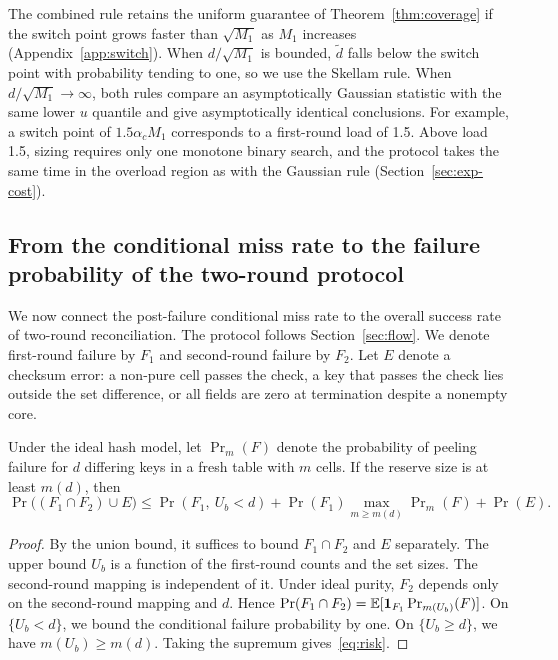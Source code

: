 The combined rule retains the uniform guarantee of Theorem~\ref{thm:coverage} if the switch point grows faster than $\sqrt{M_1}$ as $M_1$ increases (Appendix~\ref{app:switch}). When $d/\sqrt{M_1}$ is bounded, $\widetilde d$ falls below the switch point with probability tending to one, so we use the Skellam rule. When $d/\sqrt{M_1}\to\infty$, both rules compare an asymptotically Gaussian statistic with the same lower $u$ quantile and give asymptotically identical conclusions. For example, a switch point of $1.5\alpha_cM_1$ corresponds to a first-round load of 1.5. Above load 1.5, sizing requires only one monotone binary search, and the protocol takes the same time in the overload region as with the Gaussian rule (Section~\ref{sec:exp-cost}).

\subsection{From the conditional miss rate to the failure probability of the two-round protocol}\label{sec:protocol}
We now connect the post-failure conditional miss rate to the overall success rate of two-round reconciliation. The protocol follows Section~\ref{sec:flow}. We denote first-round failure by $F_1$ and second-round failure by $F_2$. Let $E$ denote a checksum error: a non-pure cell passes the check, a key that passes the check lies outside the set difference, or all fields are zero at termination despite a nonempty core.

\begin{theorem}\label{thm:protocol}
Under the ideal hash model, let $\Pr_m(F)$ denote the probability of peeling failure for $d$ differing keys in a fresh table with $m$ cells. If the reserve size is at least $m(d)$, then
\begin{equation}
\Pr\big((F_1\cap F_2)\cup E\big)
\le\Pr(F_1,\ U_b<d)+\Pr(F_1)\max_{m\ge m(d)}\Pr\nolimits_m(F)+\Pr(E).\label{eq:risk}
\end{equation}
\end{theorem}

\begin{proof}
By the union bound, it suffices to bound $F_1\cap F_2$ and $E$ separately. The upper bound $U_b$ is a function of the first-round counts and the set sizes. The second-round mapping is independent of it. Under ideal purity, $F_2$ depends only on the second-round mapping and $d$. Hence $\Pr(F_1\cap F_2)=\mathbb E[\mathbf 1_{F_1}\Pr_{m(U_b)}(F)]$. On $\{U_b<d\}$, we bound the conditional failure probability by one. On $\{U_b\ge d\}$, we have $m(U_b)\ge m(d)$. Taking the supremum gives~\eqref{eq:risk}.
\end{proof}

